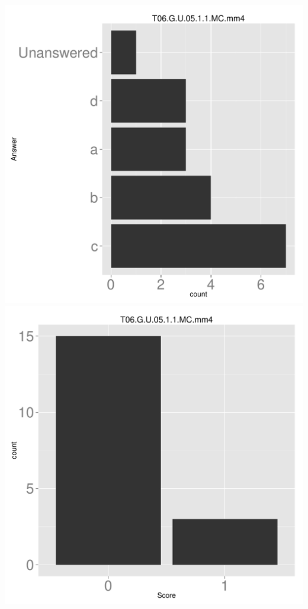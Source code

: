 \documentclass[12pt,nohyper]{tufte-handout}\usepackage[]{graphicx}\usepackage[]{color}
\begin{document}
\begin{center} \includegraphics[width=.45\linewidth]{Topic06_85_answer} \includegraphics[width=.45\linewidth]{Topic06_85_score} \end{center} 
\end{document}
